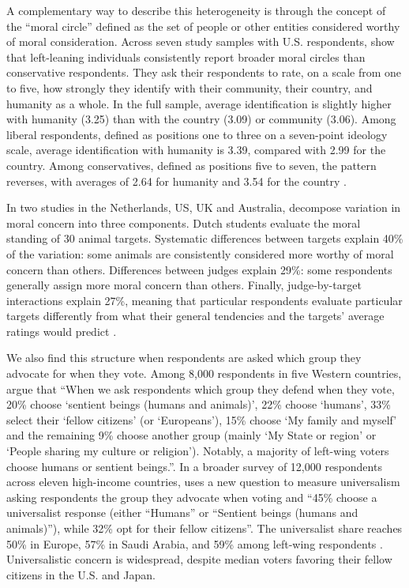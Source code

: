 \documentclass[11pt,a4paper]{article}
\begin{document}

A complementary way to describe this heterogeneity is through the concept of the ``moral circle'' defined as the set of people or other entities considered worthy of moral consideration.
Across seven study samples with U.S. respondents, \citet{waytz_ideological_2019} show that left-leaning individuals consistently report broader moral circles than conservative respondents. They ask their respondents to rate, on a scale from one to five, how strongly they identify with their community, their country, and humanity as a whole. In the full sample, average identification is slightly higher with humanity (3.25) than with the country (3.09) or community (3.06). Among liberal respondents, defined as positions one to three on a seven-point ideology scale, average identification with humanity is 3.39, compared with 2.99 for the country. Among conservatives, defined as positions five to seven, the pattern reverses, with averages of 2.64 for humanity and 3.54 for the country \citep[Figure 3]{waytz_ideological_2019}. 

In two studies in the Netherlands, US, UK and Australia, \citet{jaeger_relative_2023} decompose variation in moral concern into three components. Dutch students evaluate the moral standing of 30 animal targets. Systematic differences between targets explain 40\% of the variation: some animals are consistently considered more worthy of moral concern than others. Differences between judges explain 29\%: some respondents generally assign more moral concern than others. Finally, judge-by-target interactions explain 27\%, meaning that particular respondents evaluate particular targets differently from what their general tendencies and the targets' average ratings would predict \citep[Figures 1]{jaeger_relative_2023}.

We also find this structure when respondents are asked which group they advocate for when they vote. Among 8,000 respondents in five Western countries, \citet{fabre_majority_2025} argue that ``When we ask respondents which group they defend when they vote, 20\% choose ‘sentient beings (humans and animals)’, 22\% choose ‘humans’, 33\% select their ‘fellow citizens’ (or ‘Europeans’), 15\% choose ‘My family and myself’ and the remaining 9\% choose another group (mainly ‘My State or region’ or ‘People sharing my culture or religion’). Notably, a majority of left-wing voters choose humans or sentient beings.''. In a broader survey of 12,000 respondents across eleven 
high-income 
countries, \citet{fabre_public_2026} uses a new question to measure universalism asking respondents the group they advocate when voting and ``45\% choose a universalist  response (either “Humans” or “Sentient beings (humans and animals)”), while 32\% opt for their fellow citizens''. The universalist share reaches 50\% in Europe, 57\% in Saudi Arabia, and 59\% among left-wing respondents \citep{fabre_public_2026}. Universalistic concern is widespread, despite median voters favoring their fellow citizens in the U.S. and Japan.
\end{document}
